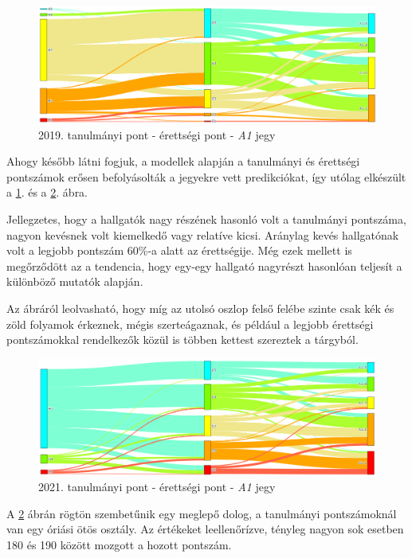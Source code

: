 \documentclass[12pt]{article}
\begin{document}
\begin{figure}[H]
\centering
\includegraphics[scale=0.6]{kepek/2019_hozott_erett_A1.png}
\caption{2019. tanulmányi pont - érettségi pont - \textit{A1} jegy}
\label{fig:2019_hozott_erett_A1}
\end{figure}
Ahogy később látni fogjuk, a modellek alapján a tanulmányi és érettségi pontszámok erősen befolyásolták a jegyekre vett predikciókat, így utólag elkészült a \ref{fig:2019_hozott_erett_A1}. és a \ref{fig:2021_hozott_erett_A1}. ábra.

Jellegzetes, hogy a hallgatók nagy részének hasonló volt a tanulmányi pontszáma, nagyon kevésnek volt kiemelkedő vagy relatíve kicsi. Aránylag kevés hallgatónak volt a legjobb pontszám 60\%-a alatt az érettségije. Még ezek mellett is megőrződött az a tendencia, hogy egy-egy hallgató nagyrészt hasonlóan teljesít a különböző mutatók alapján.

Az ábráról leolvasható, hogy míg az utolsó oszlop felső felébe szinte csak kék és zöld folyamok érkeznek, mégis szerteágaznak, és például a legjobb érettségi pontszámokkal rendelkezők közül is többen kettest szereztek a tárgyból. 

\begin{figure}[H]
\centering
\includegraphics[scale=0.6]{kepek/2021_hozott_erett_A1.png}
\caption{2021. tanulmányi pont - érettségi pont - \textit{A1} jegy}
\label{fig:2021_hozott_erett_A1}
\end{figure}

A \ref{fig:2021_hozott_erett_A1} ábrán rögtön szembetűnik egy meglepő dolog, a tanulmányi pontszámoknál van egy óriási ötös osztály. Az értékeket leellenőrízve, tényleg nagyon sok esetben 180 és 190 között mozgott a hozott pontszám.
\end{document}
